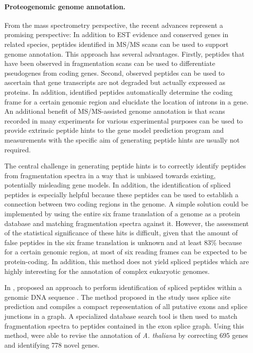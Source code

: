 \paragraph{Proteogenomic genome annotation.}

From the mass spectrometry perspective, the recent advances represent a
promising perspective: In addition to EST evidence and conserved genes in
related species, peptides identified in MS/MS scans can be used to support
genome annotation.
This approach has several advantages. Firstly, peptides that have been observed
in fragmentation scans can be used to differentiate pseudogenes from coding 
genes. 
Second, observed peptides can be used to ascertain that gene transcripts
are not degraded but actually expressed as proteins.
In addition, identified peptides automatically determine the coding frame
for a certain genomic region and elucidate the location of introns in a gene.
An additional benefit of MS/MS-assisted genome annotation is that scans recorded
in many experiments for various experimental purposes can be used to provide
extrinsic peptide hints to the gene model prediction program and measurements 
with the specific aim of generating peptide hints are usually not required.

The central challenge in generating peptide hints is to correctly identify
peptides from fragmentation spectra in a way that is unbiased towards existing,
potentially misleading gene models. 
In addition, the identification of spliced peptides is especially helpful
because these peptides can be used to establish a connection between two
coding regions in the genome.
A simple solution could be implemented by using the entire six frame translation
of a genome as a protein database and matching fragmentation spectra against
it.
However, the assessment of the statistical significance of these hits is 
difficult, given that the amount of false peptides in the six frame translation
is unknown and at least 83\% because for a certain genomic region, at most
of six reading frames can be expected to be protein-coding.
In addition, this method does not yield spliced peptides which are highly
interesting for the annotation of complex eukaryotic genomes.


In \citeyear{Tanner2007}, \citeauthor{Tanner2007} proposed an approach to
perform identification of spliced peptides within a genomic DNA sequence 
\citep{Tanner2007}.
The method proposed in the study uses splice site prediction and compiles
a compact representation of all putative exons and splice junctions in a 
graph.
A specialized database search tool is then used to match fragmentation spectra
to peptides contained in the exon splice graph.
Using this method, \citeauthor{Castellana2008} were able to revise the 
annotation of {\em A. thaliana} by correcting 695 genes and identifying
778 novel genes.

